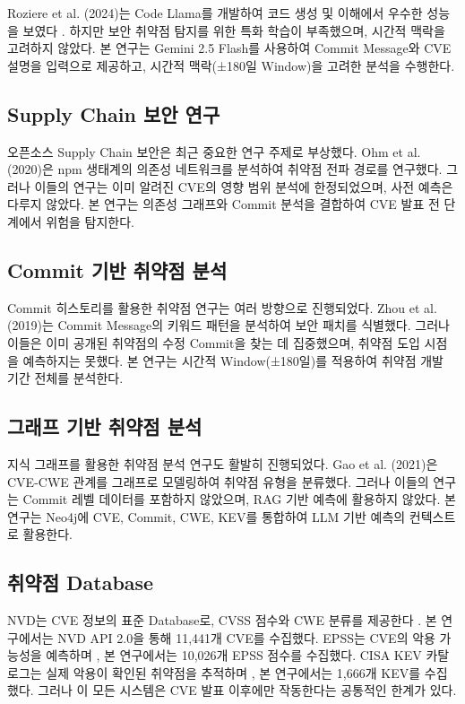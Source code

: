 ﻿\documentclass[conference]{IEEEtran}
\begin{document}
Roziere et al. (2024)는 Code Llama를 개발하여 코드 생성 및 이해에서 우수한 성능을 보였다 \cite{roziere2024}. 하지만 보안 취약점 탐지를 위한 특화 학습이 부족했으며, 시간적 맥락을 고려하지 않았다. 본 연구는 Gemini 2.5 Flash를 사용하여 Commit Message와 CVE 설명을 입력으로 제공하고, 시간적 맥락(±180일 Window)을 고려한 분석을 수행한다.

\subsection{Supply Chain 보안 연구}

오픈소스 Supply Chain 보안은 최근 중요한 연구 주제로 부상했다. Ohm et al. (2020)은 npm 생태계의 의존성 네트워크를 분석하여 취약점 전파 경로를 연구했다. 그러나 이들의 연구는 이미 알려진 CVE의 영향 범위 분석에 한정되었으며, 사전 예측은 다루지 않았다. 본 연구는 의존성 그래프와 Commit 분석을 결합하여 CVE 발표 전 단계에서 위험을 탐지한다.

\subsection{Commit 기반 취약점 분석}

Commit 히스토리를 활용한 취약점 연구는 여러 방향으로 진행되었다. Zhou et al. (2019)는 Commit Message의 키워드 패턴을 분석하여 보안 패치를 식별했다. 그러나 이들은 이미 공개된 취약점의 수정 Commit을 찾는 데 집중했으며, 취약점 도입 시점을 예측하지는 못했다. 본 연구는 시간적 Window(±180일)를 적용하여 취약점 개발 기간 전체를 분석한다.

\subsection{그래프 기반 취약점 분석}

지식 그래프를 활용한 취약점 분석 연구도 활발히 진행되었다. Gao et al. (2021)은 CVE-CWE 관계를 그래프로 모델링하여 취약점 유형을 분류했다. 그러나 이들의 연구는 Commit 레벨 데이터를 포함하지 않았으며, RAG 기반 예측에 활용하지 않았다. 본 연구는 Neo4j에 CVE, Commit, CWE, KEV를 통합하여 LLM 기반 예측의 컨텍스트로 활용한다.

\subsection{취약점 Database}

NVD는 CVE 정보의 표준 Database로, CVSS 점수와 CWE 분류를 제공한다 \cite{nvd2024}. 본 연구에서는 NVD API 2.0을 통해 11,441개 CVE를 수집했다. EPSS는 CVE의 악용 가능성을 예측하며 \cite{epss2024}, 본 연구에서는 10,026개 EPSS 점수를 수집했다. CISA KEV 카탈로그는 실제 악용이 확인된 취약점을 추적하며 \cite{cisa2024}, 본 연구에서는 1,666개 KEV를 수집했다. 그러나 이 모든 시스템은 CVE 발표 이후에만 작동한다는 공통적인 한계가 있다.
\end{document}
